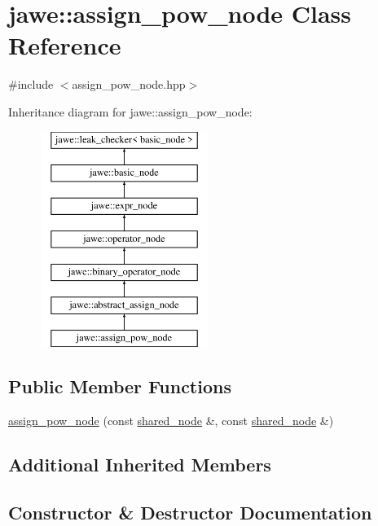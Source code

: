 \hypertarget{classjawe_1_1assign__pow__node}{}\section{jawe\+:\+:assign\+\_\+pow\+\_\+node Class Reference}
\label{classjawe_1_1assign__pow__node}


{\ttfamily \#include $<$assign\+\_\+pow\+\_\+node.\+hpp$>$}

Inheritance diagram for jawe\+:\+:assign\+\_\+pow\+\_\+node\+:\begin{figure}[H]
\begin{center}
\leavevmode
\includegraphics[height=7.000000cm]{classjawe_1_1assign__pow__node}
\end{center}
\end{figure}
\subsection*{Public Member Functions}
\begin{DoxyCompactItemize}
\item 
\hyperlink{classjawe_1_1assign__pow__node_acb02ec954455cce18c9280a54c0afbf7}{assign\+\_\+pow\+\_\+node} (const \hyperlink{namespacejawe_a3f307481d921b6cbb50cc8511fc2b544}{shared\+\_\+node} \&, const \hyperlink{namespacejawe_a3f307481d921b6cbb50cc8511fc2b544}{shared\+\_\+node} \&)
\end{DoxyCompactItemize}
\subsection*{Additional Inherited Members}


\subsection{Constructor \& Destructor Documentation}
\mbox{\label{classjawe_1_1assign__pow__node_acb02ec954455cce18c9280a54c0afbf7}} 

